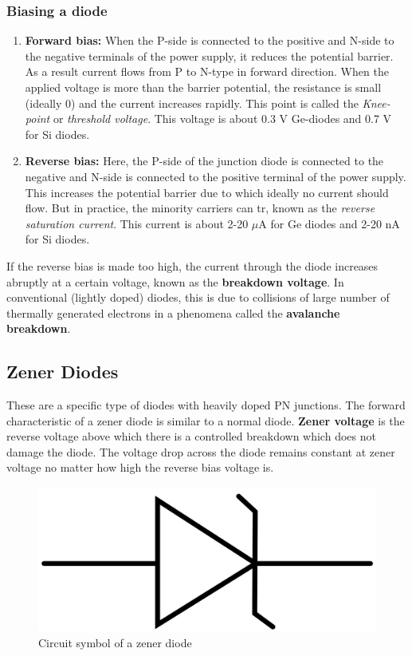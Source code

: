 \subsubsection{Biasing a diode}

\begin{enumerate}
    \item \textbf{Forward bias:} When the P-side is connected to the positive and N-side to the negative terminals of the power supply, it reduces the potential barrier. As a result current flows from P to N-type in forward direction. When the applied voltage is more than the barrier potential, the resistance is small (ideally 0) and the current increases rapidly. This point is called the \textit{Knee-point} or \textit{threshold voltage}. This voltage is about 0.3 V Ge-diodes and 0.7 V for Si diodes. 

    \item \textbf{Reverse bias:} Here, the P-side of the junction diode is connected to the negative and N-side is connected to the positive terminal of the power supply. This increases the potential barrier due to which ideally no current should flow. But in practice, the minority carriers can tr, known as the \textit{reverse saturation current}. This current is about 2-20 $\mu$A for Ge diodes and 2-20 nA for Si diodes.
\end{enumerate}

If the reverse bias is made too high, the current through the diode increases abruptly at a certain voltage, known as the \textbf{breakdown voltage}. In conventional (lightly doped) diodes, this is due to collisions of large number of thermally generated electrons in a phenomena called the \textbf{avalanche breakdown}.


\subsection{Zener Diodes}
These are a specific type of diodes with heavily doped PN junctions. The forward characteristic of a zener diode is similar to a normal diode. \textbf{Zener voltage} is the reverse voltage above which there is a controlled breakdown which does not damage the diode. The voltage drop across the diode remains constant at zener voltage no matter how high the reverse bias voltage is.

\begin{figure}[H]
    \centering
    \includegraphics[width=0.2\columnwidth]{images/d4.png}
    \caption{Circuit symbol of a zener diode}
\end{figure}

